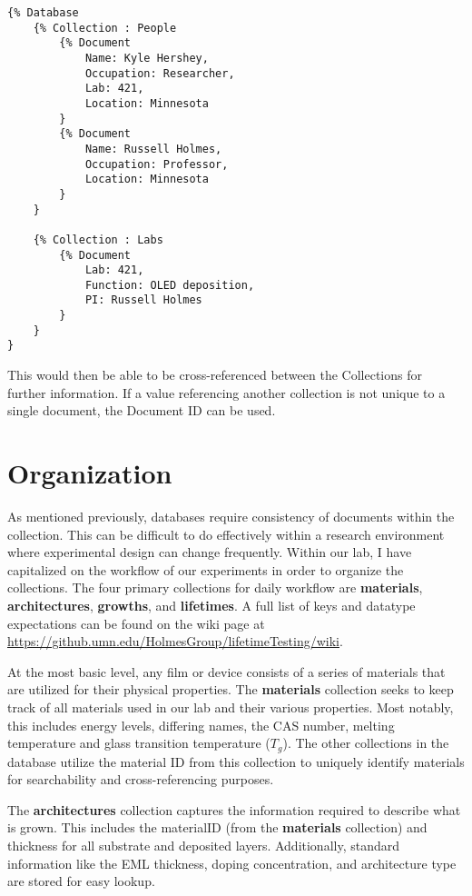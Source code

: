 \documentclass[../thesis.tex]{subfiles}
\begin{document}
\begin{lstlisting}
{% Database 
    {% Collection : People
        {% Document
            Name: Kyle Hershey,
            Occupation: Researcher,
            Lab: 421,
            Location: Minnesota
        }
        {% Document
            Name: Russell Holmes,
            Occupation: Professor,
            Location: Minnesota
        }
    }

    {% Collection : Labs
        {% Document
            Lab: 421,
            Function: OLED deposition,
            PI: Russell Holmes
        }
    }
}

\end{lstlisting}

This would then be able to be cross-referenced between the Collections for further information.
If a value referencing another collection is not unique to a single document, the Document ID can be used.


\section{Organization}

As mentioned previously, databases require consistency of documents within the collection.
This can be difficult to do effectively within a research environment where experimental design can change frequently.
Within our lab, I have capitalized on the workflow of our experiments in order to organize the collections.
The four primary collections for daily workflow are \textbf{materials}, \textbf{architectures}, \textbf{growths}, and \textbf{lifetimes}.
A full list of keys and datatype expectations can be found on the wiki page at \url{https://github.umn.edu/HolmesGroup/lifetimeTesting/wiki}.

At the most basic level, any film or device consists of a series of materials that are utilized for their physical properties.
The \textbf{materials} collection seeks to keep track of all materials used in our lab and their various properties.  
Most notably, this includes energy levels, differing names, the CAS number, melting temperature and glass transition temperature ($T_g$).
The other collections in the database utilize the material ID from this collection to uniquely identify materials for searchability and cross-referencing purposes.

The \textbf{architectures} collection captures the information required to describe what is grown.
This includes the materialID (from the \textbf{materials} collection) and thickness for all substrate and deposited layers.  
Additionally, standard information like the EML thickness, doping concentration, and architecture type are stored for easy lookup.
\end{document}
